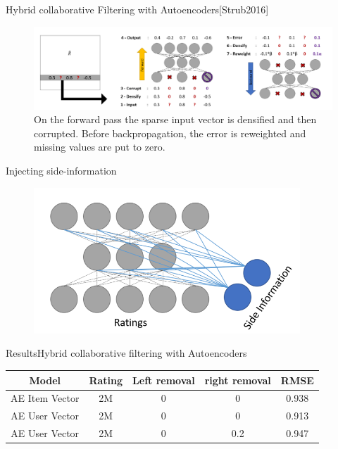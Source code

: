 \documentclass{beamer} %
\begin{document}
\begin{frame}{Hybrid collaborative Filtering with Autoencoders}{[Strub2016]}

    \begin{figure}
    
    	\includegraphics[width=12cm]{images/CF-with-AR-0.png}
    	\caption{On the forward pass the sparse input vector is densified and then corrupted. Before backpropagation, the error is reweighted and missing values are put to zero.}
    
    \end{figure}

\end{frame}

\begin{frame}{Injecting side-information}	

	\begin{figure}[h]
	  \includegraphics[width=10cm]{images/hybrid-cf-w-AE-2.png}
	\end{figure}

\end{frame}


\begin{frame}{Results}{Hybrid collaborative filtering with Autoencoders}

  \begin{center}
    \begin{tabular}{|c|c|c|c|c|}
    
       \hline
       Model & Rating & Left removal & right removal & RMSE \\
       \hline       
		AE Item Vector &  2M & 0 & 0 & 0.938 \\
        AE User Vector &  2M &  0  &  0 & 0.913 \\
   	    AE User Vector &  2M &  0  &  0.2 & 0.947 \\

       \hline
    \end{tabular}
  \end{center}
\end{frame}
\end{document}
